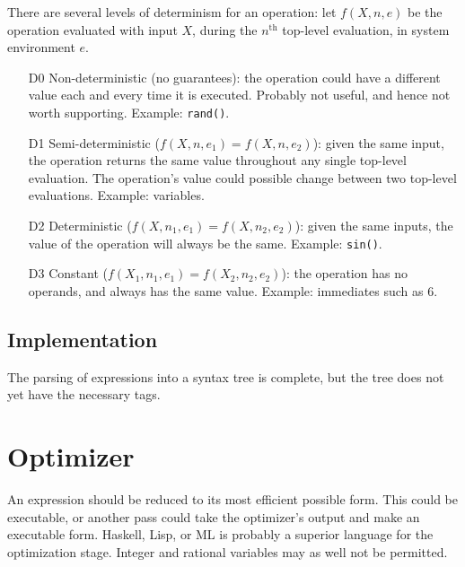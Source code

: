 \documentclass{article}
\begin{document}
There are several levels of determinism for an operation: let $f(X, n, e)$ be the operation evaluated with input $X$, during the $n^\mathrm{th}$ top-level evaluation, in system environment $e$.
\begin{enumerate}
  \item[D0] Non-deterministic (no guarantees): the operation could have a different value each and every time it is executed.
  Probably not useful, and hence not worth supporting.
  Example: \texttt{rand()}.

  \item[D1] Semi-deterministic ($f(X, n, e_1) = f(X, n, e_2)$): given the same input, the operation returns the same value throughout any single top-level evaluation.
  The operation's value could possible change between two top-level evaluations.
  Example: variables.
  
  \item[D2] Deterministic ($f(X, n_1, e_1) = f(X, n_2, e_2)$): given the same inputs, the value of the operation will always be the same.
  Example: \texttt{sin()}.
  
  \item[D3] Constant ($f(X_1, n_1, e_1) = f(X_2, n_2, e_2)$): the operation has no operands, and always has the same value.
  Example: immediates such as 6.
\end{enumerate}

\subsection{Implementation}
The parsing of expressions into a syntax tree is complete, but the tree does not yet have the necessary tags.

\section{Optimizer}

An expression should be reduced to its most efficient possible form.
This could be executable, or another pass could take the optimizer's output and make an executable form.
Haskell, Lisp, or ML is probably a superior language for the optimization stage.
Integer and rational variables may as well not be permitted.
\end{document}
